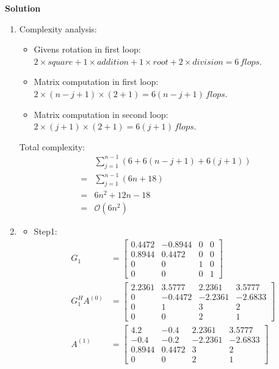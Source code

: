 \documentclass[english,onecolumn]{IEEEtran}
\begin{document}
\noindent
\textbf{Solution}
\begin{enumerate}
    \item Complexity analysis:
    	\begin{itemize}
    		\item Givens rotation in first loop: $2\times square + 1 \times addition + 1\times root + 2 \times division = 6\, flops$.
    		\item Matrix computation in first loop: $2\times (n-j+1) \times (2 + 1) = 6(n-j+1)\,flops$.
    		\item Matrix computation in second loop:   $2\times (j+1) \times (2 + 1) = 6(j+1)\,flops$.
    	\end{itemize}
    Total complexity:
    \begin{align*}
    	&\sum_{j=1}^{n-1}\left(6 + 6(n-j+1) + 6(j+1)\right)\\
    	=&\sum_{j=1}^{n-1}(6n + 18)\\
    	=&6n^2 +12n-18\\
    	=&\mathcal{O}(6n^2)
    \end{align*}
    \item
    \begin{itemize}
    	\item Step1:
    		\begin{align*}
    			G_1 &= \begin{bmatrix}
    			0.4472 & -0.8944 & 0 & 0\\
    			0.8944 & 0.4472 & 0 & 0\\
    			0 & 0 & 1 & 0\\
    			0 & 0 & 0 & 1
     		\end{bmatrix}\\
     		G_1^HA^{(0)} &= \begin{bmatrix}
     			2.2361 & 3.5777 & 2.2361 & 3.5777\\
     			0 & -0.4472 & -2.2361 & -2.6833 \\
     			0 & 1 & 3  & 2\\
     			0 & 0 & 2 &1
     		\end{bmatrix}\\
     		A^{(1)} & = \begin{bmatrix}
     			4.2 & -0.4 & 2.2361 & 3.5777\\
     			-0.4 & -0.2 & -2.2361 & -2.6833\\
     			0.8944 & 0.4472 & 3 & 2 \\
     			0 & 0 & 2 & 1
     		\end{bmatrix}
    		\end{align*}

\end{itemize}
\end{enumerate}
\end{document}
